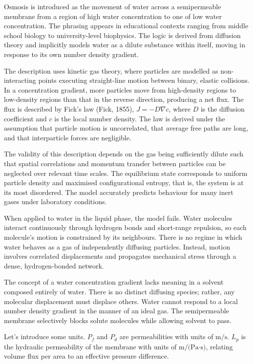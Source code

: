 Osmosis is introduced as the movement of water across a semipermeable membrane from a region of \QSOpen{}high water concentration\QSClose{} to one of \QSOpen{}low water concentration.\QSClose{} The phrasing appears in educational contexts ranging from middle school biology to university-level biophysics. The logic is derived from diffusion theory and implicitly models water as a dilute substance within itself, moving in response to its own number density gradient.

The description uses kinetic gas theory, where particles are modelled as non-interacting points executing straight-line motion between binary, elastic collisions. In a concentration gradient, more particles move from high-density regions to low-density regions than that in the reverse direction, producing a net flux. The flux is described by Fick's law (Fick, 1855), $J = -D \nabla c$, where $D$ is the diffusion coefficient and $c$ is the local number density. The law is derived under the assumption that particle motion is uncorrelated, that average free paths are long, and that interparticle forces are negligible.

The validity of this description depends on the gas being sufficiently dilute such that spatial correlations and momentum transfer between particles can be neglected over relevant time scales. The equilibrium state corresponds to uniform particle density and maximised configurational entropy, that is, the system is at its most disordered. The model accurately predicts behaviour for many inert gases under laboratory conditions.

When applied to water in the liquid phase, the model fails. Water molecules interact continuously through hydrogen bonds and short-range repulsion, so each molecule's motion is constrained by its neighbours. There is no regime in which water behaves as a gas of independently diffusing particles. Instead, motion involves correlated displacements and propagates mechanical stress through a dense, hydrogen-bonded network.

The concept of a \QSOpen{}water concentration gradient\QSClose{} lacks meaning in a solvent composed entirely of water. There is no distinct diffusing species; rather, any molecular displacement must displace others. Water cannot respond to a local number density gradient in the manner of an ideal gas. The semipermeable membrane selectively blocks solute molecules while allowing solvent to pass.

Let's introduce some units. $P_f$ and $P_d$ are permeabilities with units of $\text{m/s}$. $L_p$ is the hydraulic permeability of the membrane with units of $\text{m/(Pa·s)}$, relating volume flux per area to an effective pressure difference.

